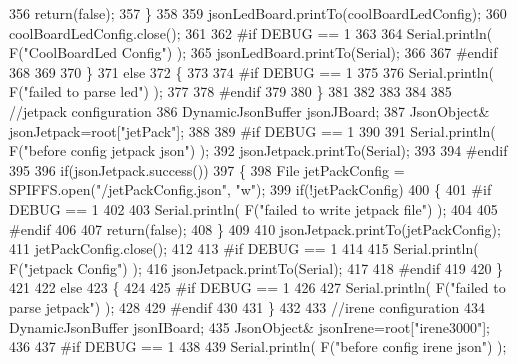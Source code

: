 \begin{DoxyCode}
356             \textcolor{keywordflow}{return}(\textcolor{keyword}{false});
357         \}
358         
359         jsonLedBoard.printTo(coolBoardLedConfig);
360         coolBoardLedConfig.close();
361 
362 \textcolor{preprocessor}{    #if DEBUG == 1 }
363 
364         Serial.println( F(\textcolor{stringliteral}{"CoolBoardLed Config"}) );     
365         jsonLedBoard.printTo(Serial);
366     
367 \textcolor{preprocessor}{    #endif}
368 
369     
370     \}
371     \textcolor{keywordflow}{else}
372     \{
373     
374 \textcolor{preprocessor}{    #if DEBUG == 1 }
375 
376         Serial.println( F(\textcolor{stringliteral}{"failed to parse led"}) );
377     
378 \textcolor{preprocessor}{    #endif }
379 
380     \}
381         
382 
383     
384 
385     \textcolor{comment}{//jetpack configuration}
386     DynamicJsonBuffer jsonJBoard;
387         JsonObject& jsonJetpack=root[\textcolor{stringliteral}{"jetPack"}];
388 
389 \textcolor{preprocessor}{#if DEBUG == 1 }
390 
391     Serial.println( F(\textcolor{stringliteral}{"before config jetpack json"}) );
392     jsonJetpack.printTo(Serial);
393 
394 \textcolor{preprocessor}{#endif}
395 
396     \textcolor{keywordflow}{if}(jsonJetpack.success())
397     \{   
398         File jetPackConfig = SPIFFS.open(\textcolor{stringliteral}{"/jetPackConfig.json"}, \textcolor{stringliteral}{"w"});   
399         \textcolor{keywordflow}{if}(!jetPackConfig)
400         \{
401 \textcolor{preprocessor}{        #if DEBUG == 1}
402 
403             Serial.println( F(\textcolor{stringliteral}{"failed to write jetpack file"}) );
404         
405 \textcolor{preprocessor}{        #endif}
406 
407             \textcolor{keywordflow}{return}(\textcolor{keyword}{false});
408         \}
409 
410         jsonJetpack.printTo(jetPackConfig);
411         jetPackConfig.close();
412 
413 \textcolor{preprocessor}{    #if DEBUG == 1}
414 
415         Serial.println( F(\textcolor{stringliteral}{"jetpack Config"}) );  
416         jsonJetpack.printTo(Serial);
417     
418 \textcolor{preprocessor}{    #endif}
419 
420     \}
421 
422     \textcolor{keywordflow}{else}
423     \{
424     
425 \textcolor{preprocessor}{    #if DEBUG == 1 }
426 
427         Serial.println( F(\textcolor{stringliteral}{"failed to parse jetpack"}) ); 
428     
429 \textcolor{preprocessor}{    #endif}
430 
431     \}
432     
433     \textcolor{comment}{//irene configuration   }
434     DynamicJsonBuffer jsonIBoard;
435         JsonObject& jsonIrene=root[\textcolor{stringliteral}{"irene3000"}];
436     
437 \textcolor{preprocessor}{#if DEBUG == 1 }
438 
439     Serial.println( F(\textcolor{stringliteral}{"before config irene json"}) );    

\end{DoxyCode}
